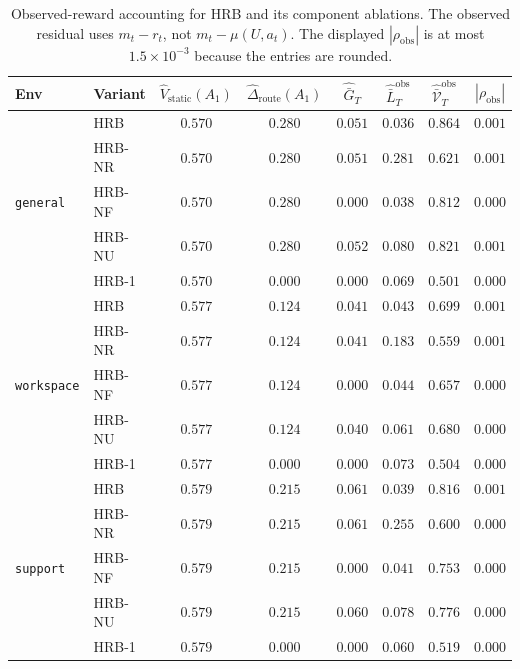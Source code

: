 \documentclass{article} %
\begin{document}
\begin{table}[h]
\centering
\small
\setlength{\tabcolsep}{4pt}
\begin{tabular}{llcccccc}
\toprule
Env & Variant & $\widehat V_{\mathrm{static}}(A_1)$ & $\widehat\Delta_{\mathrm{route}}(A_1)$ & $\widehat{\bar G}_T$ & $\widehat{\bar L}_T^{\mathrm{obs}}$ & $\widehat{\bar{\mathcal V}}_T^{\mathrm{obs}}$ & $|\rho_{\mathrm{obs}}|$ \\
\midrule
\multirow{5}{*}{\texttt{general}}
 & \textnormal{HRB}                & $0.570$ & $0.280$ & $0.051$ & $0.036$ & $0.864$ & $0.001$ \\
 & \textnormal{HRB-NR}         & $0.570$ & $0.280$ & $0.051$ & $0.281$ & $0.621$ & $0.001$ \\
 & \textnormal{HRB-NF}      & $0.570$ & $0.280$ & $0.000$ & $0.038$ & $0.812$ & $0.000$ \\
 & \textnormal{HRB-NU} & $0.570$ & $0.280$ & $0.052$ & $0.080$ & $0.821$ & $0.001$ \\
 & \textnormal{HRB-1}         & $0.570$ & $0.000$ & $0.000$ & $0.069$ & $0.501$ & $0.000$ \\
\midrule
\multirow{5}{*}{\texttt{workspace}}
 & \textnormal{HRB}                & $0.577$ & $0.124$ & $0.041$ & $0.043$ & $0.699$ & $0.001$ \\
 & \textnormal{HRB-NR}         & $0.577$ & $0.124$ & $0.041$ & $0.183$ & $0.559$ & $0.001$ \\
 & \textnormal{HRB-NF}      & $0.577$ & $0.124$ & $0.000$ & $0.044$ & $0.657$ & $0.000$ \\
 & \textnormal{HRB-NU} & $0.577$ & $0.124$ & $0.040$ & $0.061$ & $0.680$ & $0.000$ \\
 & \textnormal{HRB-1}         & $0.577$ & $0.000$ & $0.000$ & $0.073$ & $0.504$ & $0.000$ \\
\midrule
\multirow{5}{*}{\texttt{support}}
 & \textnormal{HRB}                & $0.579$ & $0.215$ & $0.061$ & $0.039$ & $0.816$ & $0.001$ \\
 & \textnormal{HRB-NR}         & $0.579$ & $0.215$ & $0.061$ & $0.255$ & $0.600$ & $0.000$ \\
 & \textnormal{HRB-NF}      & $0.579$ & $0.215$ & $0.000$ & $0.041$ & $0.753$ & $0.000$ \\
 & \textnormal{HRB-NU} & $0.579$ & $0.215$ & $0.060$ & $0.078$ & $0.776$ & $0.000$ \\
 & \textnormal{HRB-1}         & $0.579$ & $0.000$ & $0.000$ & $0.060$ & $0.519$ & $0.000$ \\
\bottomrule
\end{tabular}
\caption{Observed-reward accounting for HRB and its component ablations. The
observed residual uses \(m_t-r_t\), not \(m_t-\mu(U,a_t)\). The displayed
\(|\rho_{\mathrm{obs}}|\) is at most \(1.5\times10^{-3}\) because the entries
are rounded.}
\label{tab:app-decomp-full}
\end{table}
\end{document}
